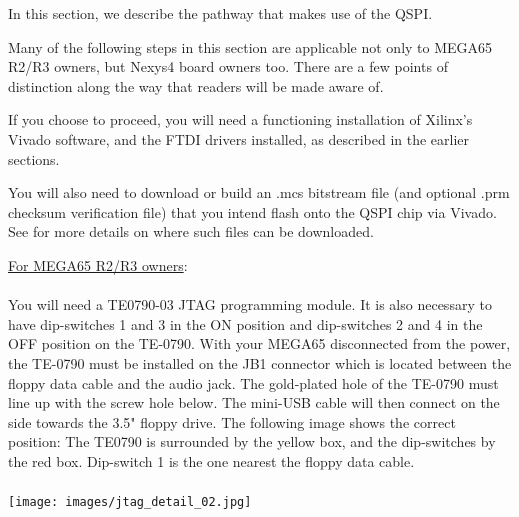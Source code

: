 In this section, we describe the pathway that makes use of the QSPI.

Many of the following steps in this section are applicable not only to MEGA65 R2/R3 owners, but Nexys4 board owners too. There are a few points of distinction along the way that readers will be made aware of.

If you choose to proceed, you will need a functioning installation of Xilinx's Vivado software, and the FTDI drivers installed, as described in the earlier sections.

You will also need to download or build an .mcs bitstream file (and optional .prm checksum verification file) that you intend flash onto the QSPI chip via Vivado. See  for more details on where such files can be downloaded.

\begin{tcolorbox}[colback=white,coltext=black]
\underline{For MEGA65 R2/R3 owners}:\\
\\
You will need a TE0790-03 JTAG programming module. It is also necessary to have
dip-switches 1 and 3 in the ON position and dip-switches 2 and 4 in the
OFF position on the TE-0790.
With your MEGA65 disconnected from the power, the TE-0790 must be
installed on the JB1 connector which is located between the floppy data cable and the audio jack.
The gold-plated hole of the TE-0790 must line up with the screw
hole below.  The mini-USB cable will then connect on the side towards the 3.5" floppy drive.
The following image shows the correct position: The TE0790 is surrounded by the yellow box,
and the dip-switches by the red box. Dip-switch 1 is the one nearest the floppy data cable. \\
\\
\texttt{[image: images/jtag\_detail\_02.jpg]}
\end{tcolorbox}

